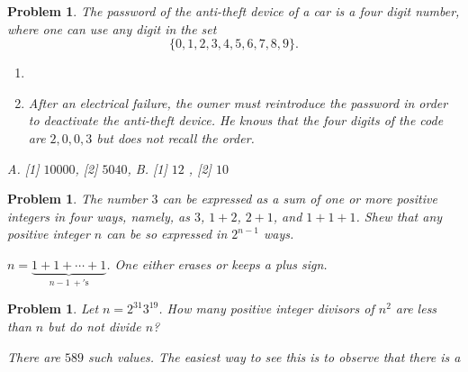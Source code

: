 \documentclass[11pt, openany]{book}
\theoremstyle{change} \theoremheaderfont{\blue\sffamily\bfseries}
\newtheorem{pro}[thm]{Problem}
\theoremstyle{nonumberplain} \theoremheaderfont{\sffamily\bfseries}
\newcommand{\í}{\'{\i}}
\begin{document}
\begin{multicols}{2}
             \begin{pro}
The password of the anti-theft device of a car is a four digit
number, where one can use any digit in the set
$$\{0,1,2,3,4,5,6,7,8,9\}.$$
\begin{enumerate} \item[A.]
\item[B.] After an electrical failure, the owner must reintroduce
the password in order to deactivate the anti-theft device. He knows
that the four digits of the code are $2,0,0,3$ but does not recall
the order.
\end{enumerate}
\begin{answer}A. [1] $10000$, [2] $5040$, B. [1] $12$ , [2] $10$
\end{answer}
   \end{pro}
          \begin{pro}
The number $3$ can be expressed as a sum of one or more positive
integers in four ways, namely, as $3$, $1+2$, $2+1$, and $1+1+1$.
Shew that any positive integer $n$ can be so expressed in $2^{n-1}$
ways.
\begin{answer} $n = \underbrace{1 + 1 + \cdots + 1}_{n-1 \ +\mathrm{'s}}$. One either erases or keeps a plus sign.\end{answer}
\end{pro}
\begin{pro}
 Let $n = 2^{31}3^{19}$. How many positive integer divisors of $n^2$ are less
than $n$ but do not divide $n$? \begin{answer} There are $589$ such
values. The easiest way to see this  is to observe that there is a

\end{answer}
\end{pro}
\end{multicols}
\end{document}
